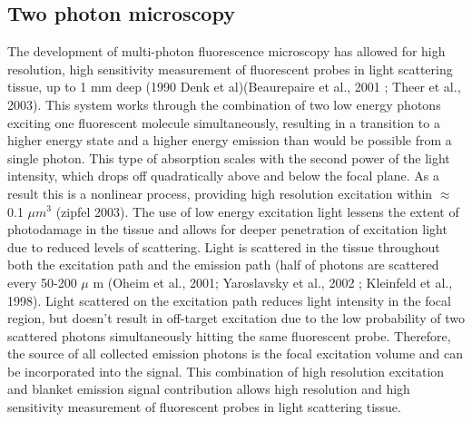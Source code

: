 \subsection{Two photon microscopy}
The development of multi-photon fluorescence microscopy has allowed for high resolution, high sensitivity measurement of fluorescent probes in light scattering tissue, up to 1 mm deep (1990 Denk et al)(Beaurepaire et al., 2001 ;  Theer et al., 2003). This system works through the combination of two low energy photons exciting one fluorescent molecule simultaneously, resulting in a transition to a higher energy state and a higher energy emission than would be possible from a single photon. This type of absorption scales with the second power of the light intensity, which drops off quadratically above and below the focal plane. As a result this is a nonlinear process, providing high resolution excitation within $ \approx $ 0.1 $ \mu m^3 $ (zipfel 2003). The use of low energy excitation light lessens the extent of photodamage in the tissue and allows for deeper penetration of excitation light due to reduced levels of scattering. Light is scattered in the tissue throughout both the excitation path and the emission path (half of photons are scattered every 50-200 $\mu$ m  (Oheim et al., 2001; Yaroslavsky et al., 2002 ;  Kleinfeld et al., 1998). Light scattered on the excitation path reduces light intensity in the focal region, but doesn't result in off-target excitation due to the low probability of two scattered photons simultaneously hitting the same fluorescent probe. Therefore, the source of all collected emission photons is the focal excitation volume and can be incorporated into the signal. This combination of high resolution excitation and blanket emission signal contribution allows high resolution and high sensitivity measurement of fluorescent probes in light scattering tissue.

